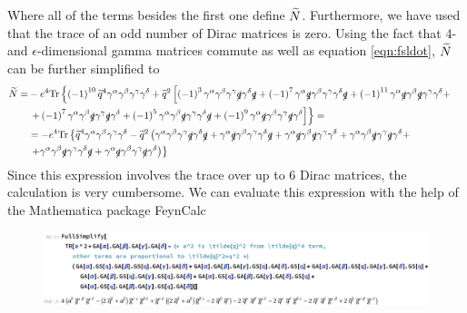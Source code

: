 Where all of the terms besides the first one define $\widetilde{N}$. Furthermore, we have used that the trace of an odd number of Dirac matrices is zero. Using the fact that 4- and $\epsilon$-dimensional gamma matrices commute as well as equation \ref{eqn:fsldot}, $\widetilde{N}$ can be further simplified to
\begin{align*}
\widetilde{N} = & -e^4 \mathrm{Tr} \left\lbrace \left( -1 \right)^{10} \widetilde{q}^4 \gamma^{\alpha} \gamma^{\beta} \gamma^{\gamma} \gamma^{\delta} + \widetilde{q}^2 \left[ \left( -1 \right) ^3  \gamma^{\alpha} \gamma^{\beta} \gamma^{\gamma} \slashed{q} \gamma^{\delta} \slashed{q}  + \left( -1 \right)^7 \gamma^{\alpha} \slashed{q} \gamma^{\beta} \gamma^{\gamma} \gamma^{\delta} \slashed{q} + \left( -1 \right)^{11} \gamma^{\alpha} \slashed{q} \gamma^{\beta} \slashed{q} \gamma^{\gamma} \gamma^{\delta} + \right. \right. & \\
& \left. \left. + \left( -1 \right)^7 \gamma^{\alpha} \gamma^{\beta} \slashed{q} \gamma^{\gamma} \slashed{q} \gamma^{\delta} + \left( -1 \right)^5 \gamma^{\alpha} \gamma^{\beta} \slashed{q} \gamma^{\gamma} \gamma^{\delta} \slashed{q} + \left( -1 \right)^9 \gamma^{\alpha} \slashed{q} \gamma^{\beta} \gamma^{\gamma} \slashed{q} \gamma^{\delta} \right] \right\rbrace = & \\
& = -e^4 \mathrm{Tr} \left\lbrace \widetilde{q}^4 \gamma^{\alpha} \gamma^{\beta} \gamma^{\gamma} \gamma^{\delta} - \widetilde{q}^2 \left( \gamma^{\alpha} \gamma^{\beta} \gamma^{\gamma} \slashed{q} \gamma^{\delta} \slashed{q} + \gamma^{\alpha} \slashed{q} \gamma^{\beta} \gamma^{\gamma} \gamma^{\delta} \slashed{q} + \gamma^{\alpha} \slashed{q} \gamma^{\beta} \slashed{q} \gamma^{\gamma} \gamma^{\delta} + \gamma^{\alpha} \gamma^{\beta} \slashed{q} \gamma^{\gamma} \slashed{q} \gamma^{\delta} + \right. \right. & \\
& \left. \left. + \gamma^{\alpha} \gamma^{\beta} \slashed{q} \gamma^{\gamma} \gamma^{\delta} \slashed{q} + \gamma^{\alpha} \slashed{q} \gamma^{\beta} \gamma^{\gamma} \slashed{q} \gamma^{\delta} \right) \right\rbrace &
\end{align*}
Since this expression involves the trace over up to 6 Dirac matrices, the calculation is very cumbersome. We can evaluate this expression with the help of the Mathematica package FeynCalc \cite{FeynCalc,FeynCalc2} 
\begin{figure}[h!]
  \begin{center}
    \includegraphics[width=1.05\textwidth]{Figures/Trace_4ptfct_Mathematica}
  \end{center}
  \setlength{\belowcaptionskip}{-20pt}
  \caption*{}
\end{figure} \\
